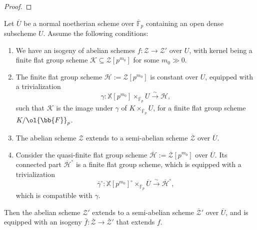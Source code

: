\documentclass[letterpaper,11pt]{amsart}
\begin{document}
\begin{proof}
\end{proof}

\begin{lemma}\label{lem:Extensibility of Isogenies} 
Let $\overline{U}$ be a normal noetherian scheme over $\overline{\mathbb{F}}_p$ containing an open dense subscheme $U$. Assume the following conditions:
\begin{enumerate}
\item  We have an isogeny of abelian schemes $f:\mathcal{Z}\to \mathcal{Z}'$ over $U$, with kernel being a finite flat group scheme $\mathcal{K}\subseteq \mathcal{Z}[p^{m_0}]$ for some $m_0\gg0$.
\item  The finite flat group scheme $\mathcal{H}:=\mathcal{Z}[p^{m_0}]$ is constant over $U$, equipped with a trivialization 
\[
\gamma: \mathbb{X}[p^{m_0}]\times_{\overline{\mathbb{F}}_p} U
\stackrel{\sim}{\to} \mathcal{H},
\]  
such that $\mathcal{K}$ is the image under $\gamma$ of $K\times_{\overline{\mathbb{F}}_p} U$, for a finite flat group scheme $K/\ol{\bb{F}}_{p}$. 
\item The abelian scheme $\mathcal{Z}$ extends to a semi-abelian scheme $\overline{\mathcal{Z}}$ over $\overline{U}$.
\item Consider the quasi-finite flat group scheme  $\overline{\mathcal{H}}:=\overline{\mathcal{Z}}[p^{m_0}]$ over $\overline{U}$. Its connected part $\overline{\mathcal{H}}^\circ$ is a finite flat group scheme, which is equipped with a trivialization 
\[
\bar{\gamma}^\circ: \mathbb{X}[p^{m_0}]^\circ\times_{\overline{\mathbb{F}}_p}\overline{U}
\stackrel{\sim}{\to} \overline{\mathcal{H}}^\circ, 
\] 
which is compatible with $\gamma$. 
\end{enumerate}
Then the abelian scheme $\mathcal{Z}'$ extends to a semi-abelian scheme $\overline{\mathcal{Z}}'$ over $\overline{U}$, and is equipped with an isogeny $\bar{f}:\overline{\mathcal{Z}}\to \overline{\mathcal{Z}}'$ that extends $f$.  
\end{lemma}
\end{document}
